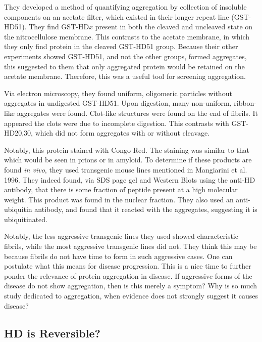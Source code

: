 They developed a method of quantifying aggregation by collection of insoluble components on an acetate filter, which existed in their longer repeat line (GST-HD51). They find GST-HD$x$ present in both the cleaved and uncleaved state on the nitrocellulose membrane. This contrasts to the acetate membrane, in which they only find protein in the cleaved GST-HD51 group. Because their other experiments showed GST-HD51, and not the other groups, formed aggregates, this suggested to them that only aggregated protein would be retained on the acetate membrane. Therefore, this was a useful tool for screening aggregation.\newline

Via electron microscopy, they found uniform, oligomeric particles without aggregates in undigested GST-HD51. Upon digestion, many non-uniform, ribbon-like aggregates were found. Clot-like structures were found on the end of fibrils. It appeared the clots were due to incomplete digestion. This contrasts with GST-HD20,30, which did not form aggregates with or without cleavage.\newline

Notably, this protein stained with Congo Red. The staining was similar to that which would be seen in prions or in amyloid. To determine if these products are found \textit{in vivo}, they used transgenic mouse lines mentioned in Mangiarini et al. 1996. They indeed found, via SDS page gel and Western Blots using the anti-HD antibody, that there is some fraction of peptide present at a high molecular weight. This product was found in the nuclear fraction. They also used an anti-ubiquitin antibody, and found that it reacted with the aggregates, suggesting it is ubiquitinated.\newline

Notably, the less aggressive transgenic lines they used showed characteristic fibrils, while the most aggressive transgenic lines did not. They think this may be because fibrils do not have time to form in such aggressive cases. One can postulate what this means for disease progression. This is a nice time to further ponder the relevance of protein aggregation in disease. If aggressive forms of the disease do not show aggregation, then is this merely a symptom? Why is so much study dedicated to aggregation, when evidence does not strongly suggest it causes disease?

\subsection*{HD is Reversible?}

